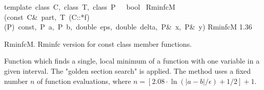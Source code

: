 \documentclass{article}
\begin{document}
\begin{cxxentry}
\begin{cxxfunction}
\begin{cxxdoc}
\end{cxxdoc}
\end{cxxfunction}
\begin{cxxfunction}
{template\ \<class\ C,\ class\ T,\ class\ P\>\ \ \ bool\ }
        {RminfcM}
        {(const\ C\&\ part,\ T\ (C::*f)(P)\ const,\ P\ a,\ P\ b,\ double\ eps,\ double\ delta,\ P\&\ x,\ P\&\ y)}
        {RminfcM}
        {1.36}
\begin{cxxdoc}
RminfcM. 
Rminfc version for const class member functions.

Function which finds a single, local minimum of a function with one
variable in a given interval. The "golden section search" is applied. The
method uses a fixed number $n$ of function evaluations, where 
$n = [2.08\cdot\ln(|a-b|/\epsilon)+1/2] + 1$. 


\end{cxxdoc}
\end{cxxfunction}
\end{cxxentry}
\end{document}
